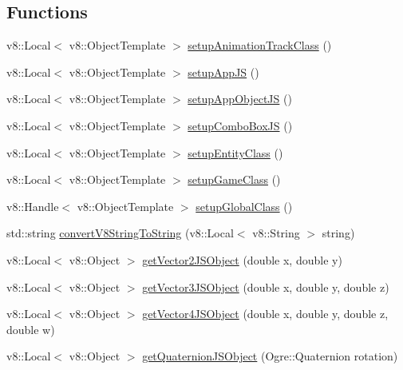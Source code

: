 \subsection*{Functions}
\begin{DoxyCompactItemize}
\item 
v8\-::\-Local$<$ v8\-::\-Object\-Template $>$ \hyperlink{namespace_rad_xml_a4cdb21de578c1e3019c61d8211e4cad0}{setup\-Animation\-Track\-Class} ()
\item 
v8\-::\-Local$<$ v8\-::\-Object\-Template $>$ \hyperlink{namespace_rad_xml_a21646ad62d978d348e70475f3bc22090}{setup\-App\-J\-S} ()
\item 
v8\-::\-Local$<$ v8\-::\-Object\-Template $>$ \hyperlink{namespace_rad_xml_af7d97e300cbb971b6e3c11795a9c1d5b}{setup\-App\-Object\-J\-S} ()
\item 
v8\-::\-Local$<$ v8\-::\-Object\-Template $>$ \hyperlink{namespace_rad_xml_a9c178995f5200c689609b72568036696}{setup\-Combo\-Box\-J\-S} ()
\item 
v8\-::\-Local$<$ v8\-::\-Object\-Template $>$ \hyperlink{namespace_rad_xml_af9a4bc0bc4fecba4ade394bdb1d6aa53}{setup\-Entity\-Class} ()
\item 
v8\-::\-Local$<$ v8\-::\-Object\-Template $>$ \hyperlink{namespace_rad_xml_a9542717096c36b981cbc938d4685c901}{setup\-Game\-Class} ()
\item 
v8\-::\-Handle$<$ v8\-::\-Object\-Template $>$ \hyperlink{namespace_rad_xml_aaef6149befb6827a7171262765c6eb7e}{setup\-Global\-Class} ()
\item 
std\-::string \hyperlink{namespace_rad_xml_a214b885eed2f28edddcfde4ab7d2b613}{convert\-V8\-String\-To\-String} (v8\-::\-Local$<$ v8\-::\-String $>$ string)
\item 
v8\-::\-Local$<$ v8\-::\-Object $>$ \hyperlink{namespace_rad_xml_a1fc0bc5338f0306f1b4469e2ede8c03c}{get\-Vector2\-J\-S\-Object} (double x, double y)
\item 
v8\-::\-Local$<$ v8\-::\-Object $>$ \hyperlink{namespace_rad_xml_a25e93e8add6baf2d9e72b5c2a442f79b}{get\-Vector3\-J\-S\-Object} (double x, double y, double z)
\item 
v8\-::\-Local$<$ v8\-::\-Object $>$ \hyperlink{namespace_rad_xml_a871d932f52fa80b04b89e21233b1fecd}{get\-Vector4\-J\-S\-Object} (double x, double y, double z, double w)
\item 
v8\-::\-Local$<$ v8\-::\-Object $>$ \hyperlink{namespace_rad_xml_a40bb632bc6f3a4cfa1cca952df694086}{get\-Quaternion\-J\-S\-Object} (Ogre\-::\-Quaternion rotation)
\item 

\end{DoxyCompactItemize}
